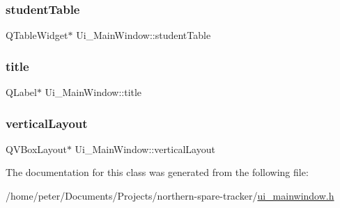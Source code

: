 \mbox{\label{class_ui___main_window_a8a4ca2500b06916259580c9e0da5e4e7}} 
\subsubsection{\texorpdfstring{student\+Table}{studentTable}}
{\footnotesize\ttfamily Q\+Table\+Widget$\ast$ Ui\+\_\+\+Main\+Window\+::student\+Table}

\mbox{\label{class_ui___main_window_a330a07aad35056d3f75fb65ca7d96270}} 
\subsubsection{\texorpdfstring{title}{title}}
{\footnotesize\ttfamily Q\+Label$\ast$ Ui\+\_\+\+Main\+Window\+::title}

\mbox{\label{class_ui___main_window_aecd96a04789fcfec3f98d80390ad8184}} 
\subsubsection{\texorpdfstring{vertical\+Layout}{verticalLayout}}
{\footnotesize\ttfamily Q\+V\+Box\+Layout$\ast$ Ui\+\_\+\+Main\+Window\+::vertical\+Layout}



The documentation for this class was generated from the following file\+:\begin{DoxyCompactItemize}
\item 
/home/peter/\+Documents/\+Projects/northern-\/spare-\/tracker/\hyperlink{ui__mainwindow_8h}{ui\+\_\+mainwindow.\+h}\end{DoxyCompactItemize}
